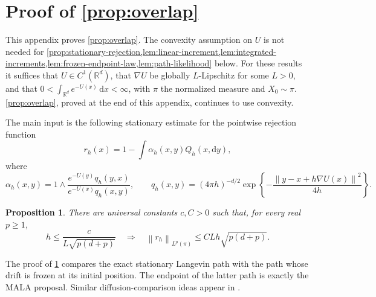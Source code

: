 \documentclass[11pt]{article}
\newtheorem{proposition}[proposition]{Proposition}
\newcommand{\R}{\mathbb R}
\newcommand{\norm}[1]{\left\lVert #1\right\rVert}
\newcommand{\1}{\mathbf 1}
\newcommand{\df}{\mathrm{d}}
\begin{document}
	
	
	
	
	\section{Proof of \cref{prop:overlap}}\label{app:rejection-overlap}
	
	This appendix proves \cref{prop:overlap}.
	The convexity assumption on \(U\) is not needed for
	\cref{prop:stationary-rejection,lem:linear-increment,lem:integrated-increments,lem:frozen-endpoint-law,lem:path-likelihood} below.
	For these results it suffices that \(U\in C^1(\R^d)\), that
	\(\nabla U\) be globally \(L\)-Lipschitz for some \(L>0\), and that
	\(0<\int_{\R^d}e^{-U(x)}\,\df x<\infty\), with \(\pi\) the normalized
	measure and \(X_0\sim\pi\). 
	\cref{prop:overlap}, proved at the end of
	this appendix, continues to use convexity.
	
	The main input is the following stationary estimate for the pointwise rejection function
	\[
	r_h(x)=1-\int\alpha_h(x,y)Q_h(x,\df y),
	\]
	where
	\[
	\alpha_h(x,y)
	=1\wedge
	\frac{e^{-U(y)}q_h(y,x)}{e^{-U(x)}q_h(x,y)},
	\qquad
	q_h(x,y)=(4\pi h)^{-d/2}
	\exp\left\{-\frac{\norm{y-x+h\nabla U(x)}^2}{4h}\right\}.
	\]
	
	
	\begin{proposition} \label{prop:stationary-rejection}
		There are universal constants \(c,C>0\) such that, for every real
		\(p\geq 1\),
		\begin{equation}\label{eq:stationary-rejection}
			h\leq\frac{c}{L\sqrt{p(d+p)}}
			\quad\Longrightarrow\quad
			\norm{r_h}_{L^p(\pi)}
			\leq
			CLh\sqrt{p(d+p)}.
		\end{equation}
	\end{proposition}
	
	The proof of \cref{prop:stationary-rejection} compares the exact stationary Langevin path with the path whose
	drift is frozen at its initial position.  The endpoint of the latter path
	is exactly the MALA proposal.  Similar diffusion-comparison ideas appear in
	\citet{BouRabeeVandenEijnden2010,BouRabeeHairer2013,ChewiEtAl2021}.
	
\end{document}
